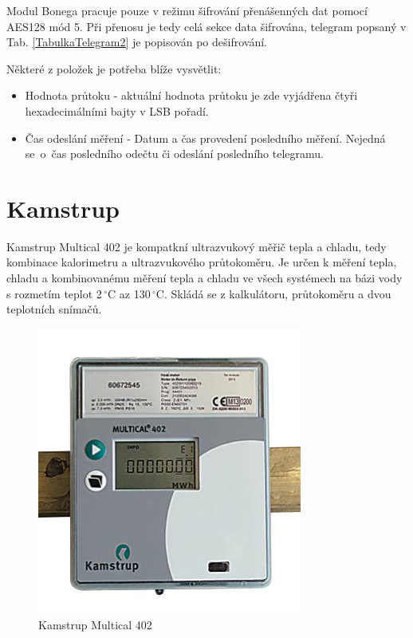 Modul Bonega pracuje pouze v režimu šifrování přenášenných dat pomocí AES128 mód 5. Při přenosu je tedy celá sekce data šifrována, telegram popsaný v Tab. \ref{TabulkaTelegram2} je popisován po dešifrování.

Některé z položek je potřeba blíže vysvětlit:

\begin{itemize}
	\item Hodnota průtoku - aktuální hodnota průtoku je zde vyjádřena čtyři hexadecimálními bajty v LSB pořadí.
	\item Čas odeslání měření - Datum a čas provedení posledního měření. Nejedná se~o~čas posledního odečtu či odeslání posledního telegramu.
\end{itemize}



	
	\section{Kamstrup}
	
	Kamstrup Multical 402 je kompatkní ultrazvukový měřič tepla a chladu, tedy kombinace kalorimetru a ultrazvukového průtokoměru. Je určen k měření tepla, chladu a kombinovanému měření tepla a chladu ve všech systémech na bázi vody s rozmetím teplot 2\,$^{\circ}$C az 130\,$^{\circ}$C. Skládá se z kalkulátoru, průtokoměru a dvou teplotních snímačů. 
	
 \begin{figure}[!ht]
\vspace{-20pt}
  \begin{center}
    \includegraphics[scale=0.65]{obrazky/zarizeni_kamstrup}
  \end{center}
	\vspace{-30pt}
  \caption{Kamstrup Multical 402~\cite{CidloKamstrup}}
	\vspace{-20pt}
\end{figure}
	
